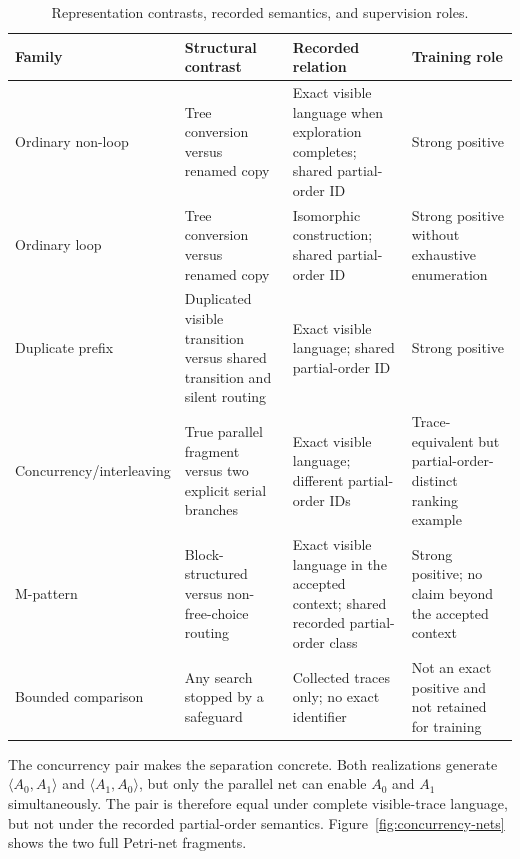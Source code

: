 \documentclass[pdflatex,sn-basic]{sn-jnl}
\begin{document}
\begin{table}[!t]
\centering
\caption{Representation contrasts, recorded semantics, and supervision roles.}
\label{tab:motif-cert}
\small
\begin{tabularx}{\textwidth}{@{}>{\raggedright\arraybackslash}p{}>{\raggedright\arraybackslash}p{}>{\raggedright\arraybackslash}p{}Y@{}}
\toprule
Family & Structural contrast & Recorded relation & Training role \\
\midrule
Ordinary non-loop & Tree conversion versus renamed copy & Exact visible language when exploration completes; shared partial-order ID & Strong positive \\
Ordinary loop & Tree conversion versus renamed copy & Isomorphic construction; shared partial-order ID & Strong positive without exhaustive enumeration \\
Duplicate prefix & Duplicated visible transition versus shared transition and silent routing & Exact visible language; shared partial-order ID & Strong positive \\
Concurrency/\newline interleaving & True parallel fragment versus two explicit serial branches & Exact visible language; different partial-order IDs & Trace-equivalent but partial-order-distinct ranking example \\
M-pattern & Block-structured versus non-free-choice routing & Exact visible language in the accepted context; shared recorded partial-order class & Strong positive; no claim beyond the accepted context \\
Bounded comparison & Any search stopped by a safeguard & Collected traces only; no exact identifier & Not an exact positive and not retained for training \\
\bottomrule
\end{tabularx}
\end{table}

The concurrency pair makes the separation concrete. Both realizations generate $\langle A_0,A_1\rangle$ and $\langle A_1,A_0\rangle$, but only the parallel net can enable $A_0$ and $A_1$ simultaneously. The pair is therefore equal under complete visible-trace language, but not under the recorded partial-order semantics. Figure~\ref{fig:concurrency-nets} shows the two full Petri-net fragments.
\end{document}
